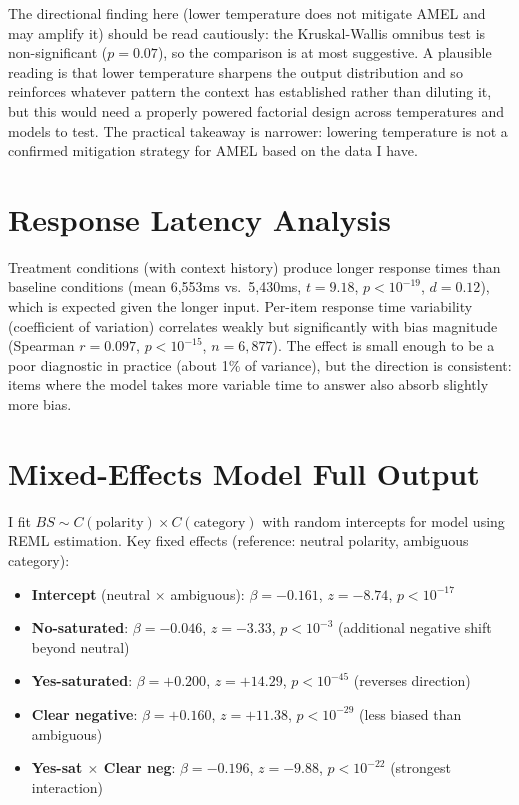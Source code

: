 \documentclass[10pt,twocolumn]{article}
\begin{document}
The directional finding here (lower temperature does not mitigate AMEL and may amplify it) should be read cautiously: the Kruskal-Wallis omnibus test is non-significant ($p = 0.07$), so the comparison is at most suggestive.
A plausible reading is that lower temperature sharpens the output distribution and so reinforces whatever pattern the context has established rather than diluting it, but this would need a properly powered factorial design across temperatures and models to test.
The practical takeaway is narrower: lowering temperature is not a confirmed mitigation strategy for AMEL based on the data I have.

\section{Response Latency Analysis}
\label{app:latency}

Treatment conditions (with context history) produce longer response times than baseline conditions (mean 6,553ms vs.\ 5,430ms, $t = 9.18$, $p < 10^{-19}$, $d = 0.12$), which is expected given the longer input.
Per-item response time variability (coefficient of variation) correlates weakly but significantly with bias magnitude (Spearman $r = 0.097$, $p < 10^{-15}$, $n = 6{,}877$). The effect is small enough to be a poor diagnostic in practice (about 1\% of variance), but the direction is consistent: items where the model takes more variable time to answer also absorb slightly more bias.

\section{Mixed-Effects Model Full Output}
\label{app:mixed}

I fit $BS \sim C(\text{polarity}) \times C(\text{category})$ with random intercepts for model using REML estimation.
Key fixed effects (reference: neutral polarity, ambiguous category):

\begin{itemize}
    \item \textbf{Intercept} (neutral $\times$ ambiguous): $\beta = -0.161$, $z = -8.74$, $p < 10^{-17}$
    \item \textbf{No-saturated}: $\beta = -0.046$, $z = -3.33$, $p < 10^{-3}$ (additional negative shift beyond neutral)
    \item \textbf{Yes-saturated}: $\beta = +0.200$, $z = +14.29$, $p < 10^{-45}$ (reverses direction)
    \item \textbf{Clear negative}: $\beta = +0.160$, $z = +11.38$, $p < 10^{-29}$ (less biased than ambiguous)
    \item \textbf{Yes-sat $\times$ Clear neg}: $\beta = -0.196$, $z = -9.88$, $p < 10^{-22}$ (strongest interaction)
\end{itemize}
\end{document}
